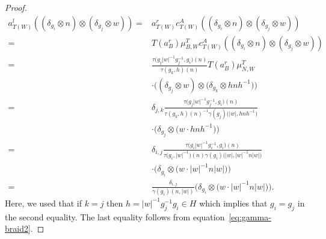 \documentclass[10pt,a4paper]{amsart}
\numberwithin{equation}{section}
\begin{document}
\begin{proof}
\begin{align*}
a^l_{T(W)}((\delta_{g_i}\otimes n)\otimes (\delta_{g_j}\otimes w))={}&a^r_{T(W)}c^{A}_{T(W)}((\delta_{g_i}\otimes n)\otimes (\delta_{g_j}\otimes w))\\
={}&T(a^r_B)\mu^T_{B,W} c^A_{T(W)}((\delta_{g_i}\otimes n)\otimes (\delta_{g_j}\otimes w))\\
={}&\frac{\tau\big(g_j|w|^{-1}g_j^{-1},g_i\big)(n)}{\tau(g_k,h)(n)}T(a_B^r)\mu^T_{N,W}\\
&\cdot \big((\delta_{g_j}\otimes w)\otimes \big(\delta_{g_k}\otimes hnh^{-1}\big)\big)\\
 ={}&\delta_{j,k}\frac{\tau\big(g_j|w|^{-1}g_j^{-1},g_i\big)(n)}{\tau(g_k,h)(n)^{-1}\gamma(g_j)\big(|w|,hnh^{-1}\big)}\\
 &\cdot \big(\delta_{g_j}\otimes \big(w\cdot hnh^{-1}\big)\big)\\
 ={}&\delta_{i,j}\frac{\tau\big(g_i|w|^{-1}g_i^{-1},g_i\big)(n)}{\tau\big(g_i,|w|^{-1}\big)(n)\gamma(g_i)\big(|w|,|w|^{-1}n|w|\big)}\\
 &\cdot \big(\delta_{g_i}\otimes \big(w\cdot|w|^{-1}n|w|\big)\big)\\
 ={}&\frac{\delta_{i,j}}{\gamma(g_i)(n,|w|)}\big(\delta_{g_i}\otimes \big(w\cdot|w|^{-1}n|w|\big)\big).
\end{align*}
Here, we used that if $k=j$ then $h=|w|^{-1}g_j^{-1}g_i\in H$ which implies that $g_i=g_j$ in the second equality. The last equality follows from equation~\eqref{eq:gamma-braid2}.


\end{proof}
\end{document}
